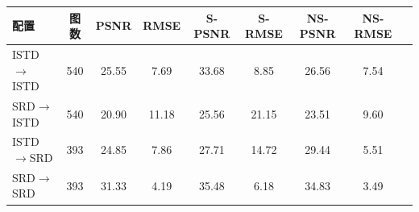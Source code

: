 \begin{tabular}{lcccccccc}
\toprule
配置 & 图数 & PSNR & RMSE & S-PSNR & S-RMSE & NS-PSNR & NS-RMSE \\
\midrule
ISTD$\rightarrow$ISTD & 540 & 25.55 & 7.69 & 33.68 & 8.85 & 26.56 & 7.54 \\
SRD$\rightarrow$ISTD & 540 & 20.90 & 11.18 & 25.56 & 21.15 & 23.51 & 9.60 \\
ISTD$\rightarrow$SRD & 393 & 24.85 & 7.86 & 27.71 & 14.72 & 29.44 & 5.51 \\
SRD$\rightarrow$SRD & 393 & 31.33 & 4.19 & 35.48 & 6.18 & 34.83 & 3.49 \\
\bottomrule
\end{tabular}